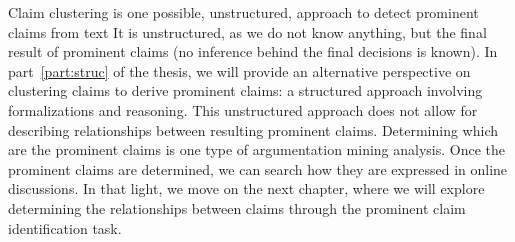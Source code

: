 Claim clustering is one possible, unstructured, approach to 
detect prominent claims from text  
It is unstructured, as we do not know anything, but the final result of
prominent claims (no inference behind the final decisions is known). In
part~\ref{part:struc} of the thesis, we will provide an
alternative perspective on clustering claims to derive prominent claims: a
structured approach involving formalizations and reasoning. This unstructured
approach does not allow for describing relationships between resulting
prominent claims. Determining which are the prominent claims is one type of 
argumentation mining analysis. Once the prominent claims are determined, we can
search how they are expressed in online discussions. 
In that light, we move on the next chapter, where we will 
explore determining the relationships between claims through the 
prominent claim identification task. 

